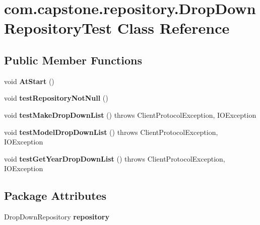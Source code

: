\hypertarget{classcom_1_1capstone_1_1repository_1_1_drop_down_repository_test}{}\section{com.\+capstone.\+repository.\+Drop\+Down\+Repository\+Test Class Reference}
\label{classcom_1_1capstone_1_1repository_1_1_drop_down_repository_test}
\subsection*{Public Member Functions}
\begin{DoxyCompactItemize}
\item 
\mbox{\label{classcom_1_1capstone_1_1repository_1_1_drop_down_repository_test_aa99de8f383feee429e2e7d947ada785b}} 
void {\bfseries At\+Start} ()
\item 
\mbox{\label{classcom_1_1capstone_1_1repository_1_1_drop_down_repository_test_a9d06546d68504a6f9a3957a0f51dee0f}} 
void {\bfseries test\+Repository\+Not\+Null} ()
\item 
\mbox{\label{classcom_1_1capstone_1_1repository_1_1_drop_down_repository_test_a3750187554644399ff6dfdae5bdc4c96}} 
void {\bfseries test\+Make\+Drop\+Down\+List} ()  throws Client\+Protocol\+Exception, I\+O\+Exception 
\item 
\mbox{\label{classcom_1_1capstone_1_1repository_1_1_drop_down_repository_test_a35cc846d37ecd6d6e21bb259ab28cbe8}} 
void {\bfseries test\+Model\+Drop\+Down\+List} ()  throws Client\+Protocol\+Exception, I\+O\+Exception 
\item 
\mbox{\label{classcom_1_1capstone_1_1repository_1_1_drop_down_repository_test_a94855c119508bbe6b231d0637795858d}} 
void {\bfseries test\+Get\+Year\+Drop\+Down\+List} ()  throws Client\+Protocol\+Exception, I\+O\+Exception 
\end{DoxyCompactItemize}
\subsection*{Package Attributes}
\begin{DoxyCompactItemize}
\item 
\mbox{\label{classcom_1_1capstone_1_1repository_1_1_drop_down_repository_test_a38831ef59a178a042e22d811db782a72}} 
Drop\+Down\+Repository {\bfseries repository}
\end{DoxyCompactItemize}


